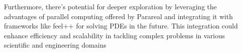 \documentclass[a4paper,12pt,french]{article}
\begin{document}
Furthermore, there's potential for deeper exploration by leveraging the advantages of parallel computing offered by Parareal and integrating it with frameworks like feel++ for solving PDEs in the future. This integration could enhance efficiency and scalability in tackling complex problems in various scientific and engineering domains

\newpage

\vspace*{\fill}

\end{document}
